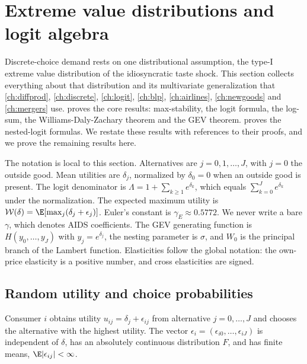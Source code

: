 \section{Extreme value distributions and logit algebra}\label{sec:B-ev}

Discrete-choice demand rests on one distributional assumption, the type-I extreme value distribution of
the idiosyncratic taste shock. This section collects everything about that distribution and its
multivariate generalization that \cref{ch:diffprod}, \cref{ch:discrete}, \cref{ch:logit}, \cref{ch:blp},
\cref{ch:airlines}, \cref{ch:newgoods} and \cref{ch:mergers} use.  proves the core results:
max-stability, the logit formula, the log-sum, the Williams-Daly-Zachary theorem and the GEV theorem.
 proves the nested-logit formulas. We restate these results with references to their proofs,
and we prove the remaining results here.

The notation is local to this section. Alternatives are $j = 0, 1, \dots, J$, with $j = 0$ the outside good.
Mean utilities are $\delta_j$, normalized by $\delta_0 = 0$ when an outside good is present. The logit
denominator is $\Lambda = 1 + \sum_{k \geq 1}e^{\delta_k}$, which equals $\sum_{k = 0}^Je^{\delta_k}$ under the
normalization. The expected maximum utility is $\mathcal{W}(\delta) = \E[\max_j(\delta_j + \epsilon_j)]$. Euler's
constant is $\gamma_E \approx 0.5772$. We never write a bare $\gamma$, which denotes AIDS coefficients. The GEV
generating function is $H(y_0, \dots, y_J)$ with $y_j = e^{\delta_j}$, the nesting parameter is $\sigma$, and
$W_0$ is the principal branch of the Lambert function. Elasticities follow the global notation: the own-price
elasticity is a positive number, and cross elasticities are signed.

\subsection{Random utility and choice probabilities}\label{sec:B-rum}

\begin{assumption}\label{ass:B-arum}
Consumer $i$ obtains utility $u_{ij} = \delta_j + \epsilon_{ij}$ from alternative $j = 0, \dots, J$ and
chooses the alternative with the highest utility. The vector
$\epsilon_i = (\epsilon_{i0}, \dots, \epsilon_{iJ})$ is independent of $\delta$, has an absolutely continuous
distribution $F$, and has finite means, $\E|\epsilon_{ij}| < \infty$.
\end{assumption}

